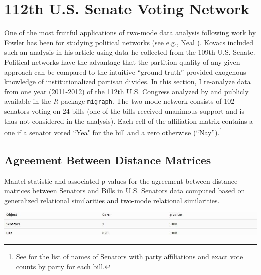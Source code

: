 \documentclass[a4paper,fleqn]{cas-sc}
\begin{document}
\section{112th U.S. Senate Voting Network}
One of the most fruitful applications of two-mode data analysis following work by Fowler \citeyearpar{fowler2006legislative} has been for studying political networks (see e.g., Neal \citeyearpar{neal2014backbone}). Kovacs included such an analysis in his article using data he collected from the 109th U.S. Senate. Political networks have the advantage that the partition quality of any given approach can be compared to the intuitive ``ground truth'' provided exogenous knowledge of institutionalized partisan divides. In this section, I re-analyze data from one year (2011-2012) of the 112th U.S. Congress analyzed by \citet[Chap. 8]{knoke2021multimodal} and publicly available in the \textit{R} package \texttt{migraph}. The two-mode network consists of 102 senators voting on 24 bills (one of the bills received unanimous support and is thus not considered in the analysis). Each cell of the affiliation matrix contains a one if a senator voted ``Yea" for the bill and a zero otherwise (``Nay'').\footnote{See \citet[Appendices 8.1 and 8.2]{knoke2021multimodal} for the list of names of Senators with party affiliations and exact vote counts by party for each bill.} 

\subsection{Agreement Between Distance Matrices}
\begin{table}[ht!]
    \caption{Mantel statistic and associated p-values for the agreement between distance matrices between Senators and Bills in \citet{knoke2021multimodal} U.S. Senators data computed based on generalized relational similarities and two-mode relational similarities.}
    \centering
    \includegraphics[width=1.0\textwidth]{Tabs/corr-tab-sb.jpg}
    \label{tab:mantel-sb}
\end{table}
\end{document}
